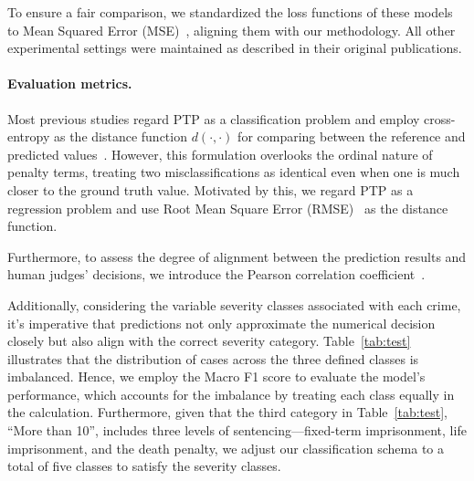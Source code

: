 To ensure a fair comparison, we standardized the loss functions of these models to Mean Squared Error (MSE)~\cite{chicco2021coefficient}, aligning them with our methodology. All other experimental settings were maintained as described in their original publications.

\paragraph{Evaluation metrics.}
Most previous studies regard PTP as a classification problem and employ cross-entropy as the distance function $d(\cdot,\cdot)$ for comparing between the reference and predicted values~\cite{feng-etal-2022-legal,ML-LJP}. 
However, this formulation overlooks the ordinal nature of penalty terms, treating two misclassifications as identical even when one is much closer to the ground truth value. Motivated by this, we regard PTP as a regression problem and use Root Mean Square Error (RMSE)~\cite{chai2014root} as the distance function. 

Furthermore, to assess the degree of alignment between the prediction results and human judges' decisions, we introduce the Pearson correlation coefficient~\cite{cohen2009pearson}. 

Additionally, considering the variable severity classes associated with each crime, it's imperative that predictions not only approximate the numerical decision closely but also align with the correct severity category. Table~\ref{tab:test} illustrates that the distribution of cases across the three defined classes is imbalanced. Hence, we employ the Macro F1 score to evaluate the model's performance, which accounts for the imbalance by treating each class equally in the calculation. Furthermore, given that the third category in Table~\ref{tab:test}, ``More than 10'', includes three levels of sentencing—fixed-term imprisonment, life imprisonment, and the death penalty, we adjust our classification schema to a total of five classes to satisfy the severity classes.

